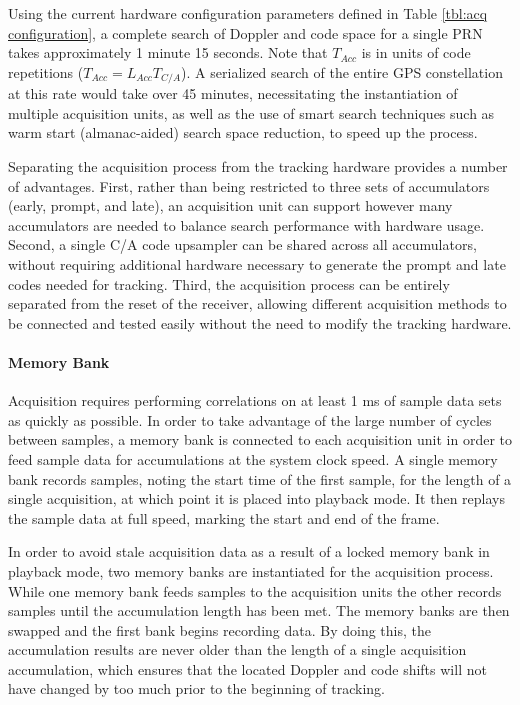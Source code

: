 \documentclass[12pt]{article}
\begin{document}
Using the current hardware configuration parameters defined in Table \ref{tbl:acq configuration}, a complete search of Doppler and code space for a single PRN takes approximately 1 minute 15 seconds.  Note that $T_{Acc}$ is in units of code repetitions ($T_{Acc} = L_{Acc} T_{C/A}$). A serialized search of the entire GPS constellation at this rate would take over 45 minutes, necessitating the instantiation of multiple acquisition units, as well as the use of smart search techniques such as warm start (almanac-aided) search space reduction, to speed up the process.

Separating the acquisition process from the tracking hardware provides a number of advantages. First, rather than being restricted to three sets of accumulators (early, prompt, and late), an acquisition unit can support however many accumulators are needed to balance search performance with hardware usage. Second, a single C/A code upsampler can be shared across all accumulators, without requiring additional hardware necessary to generate the prompt and late codes needed for tracking. Third, the acquisition process can be entirely separated from the reset of the receiver, allowing different acquisition methods to be connected and tested easily without the need to modify the tracking hardware.

\paragraph{Memory Bank}
Acquisition requires performing correlations on at least 1 ms of sample data sets as quickly as possible. In order to take advantage of the large number of cycles between samples, a memory bank is connected to each acquisition unit in order to feed sample data for accumulations at the system clock speed. A single memory bank records samples, noting the start time of the first sample, for the length of a single acquisition, at which point it is placed into playback mode. It then replays the sample data at full speed, marking the start and end of the frame.

In order to avoid stale acquisition data as a result of a locked memory bank in playback mode, two memory banks are instantiated for the acquisition process. While one memory bank feeds samples to the acquisition units the other records samples until the accumulation length has been met. The memory banks are then swapped and the first bank begins recording data. By doing this, the accumulation results are never older than the length of a single acquisition accumulation, which ensures that the located Doppler and code shifts will not have changed by too much prior to the beginning of tracking.
\end{document}
